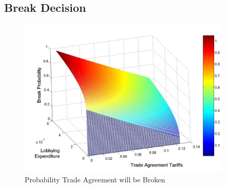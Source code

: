 \documentclass[10pt]{article}
\begin{document}
\subsection{Break Decision}



\begin{figure}
\begin{center}
\includegraphics[height=3in, width=4in]{brprob2.jpg}
\end{center}
\caption{Probability Trade Agreement will be Broken\label{fig:br}}
\end{figure}

\end{document}
